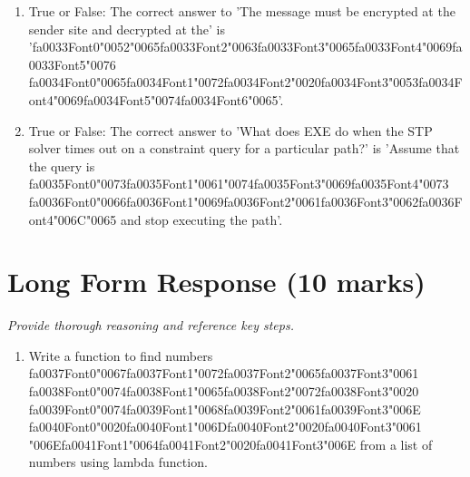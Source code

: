 \documentclass[12pt]{article}
\begin{document}
\begin{enumerate}[label=\arabic*.]
\item True or False: The correct answer to 'The message must be encrypted at the sender site and decrypted at the' is '{\csname fa0033Font0\endcsname\char"0052}{\char"0065}{\csname fa0033Font2\endcsname\char"0063}{\csname fa0033Font3\endcsname\char"0065}{\csname fa0033Font4\endcsname\char"0069}{\csname fa0033Font5\endcsname\char"0076} {\csname fa0034Font0\endcsname\char"0065}{\csname fa0034Font1\endcsname\char"0072}{\csname fa0034Font2\endcsname\char"0020}{\csname fa0034Font3\endcsname\char"0053}{\csname fa0034Font4\endcsname\char"0069}{\csname fa0034Font5\endcsname\char"0074}{\csname fa0034Font6\endcsname\char"0065}'.
\item True or False: The correct answer to 'What does EXE do when the STP solver times out on a constraint query for a particular path?' is 'Assume that the query is {\csname fa0035Font0\endcsname\char"0073}{\csname fa0035Font1\endcsname\char"0061}{\char"0074}{\csname fa0035Font3\endcsname\char"0069}{\csname fa0035Font4\endcsname\char"0073} {\csname fa0036Font0\endcsname\char"0066}{\csname fa0036Font1\endcsname\char"0069}{\csname fa0036Font2\endcsname\char"0061}{\csname fa0036Font3\endcsname\char"0062}{\csname fa0036Font4\endcsname\char"006C}{\char"0065} and stop executing the path'.
\end{enumerate}

\section*{Long Form Response (10 marks)}
\textit{Provide thorough reasoning and reference key steps.}
\begin{enumerate}[label=\arabic*.]
\item Write a function to find numbers {\csname fa0037Font0\endcsname\char"0067}{\csname fa0037Font1\endcsname\char"0072}{\csname fa0037Font2\endcsname\char"0065}{\csname fa0037Font3\endcsname\char"0061} {\csname fa0038Font0\endcsname\char"0074}{\csname fa0038Font1\endcsname\char"0065}{\csname fa0038Font2\endcsname\char"0072}{\csname fa0038Font3\endcsname\char"0020} {\csname fa0039Font0\endcsname\char"0074}{\csname fa0039Font1\endcsname\char"0068}{\csname fa0039Font2\endcsname\char"0061}{\csname fa0039Font3\endcsname\char"006E} {\csname fa0040Font0\endcsname\char"0020}{\csname fa0040Font1\endcsname\char"006D}{\csname fa0040Font2\endcsname\char"0020}{\csname fa0040Font3\endcsname\char"0061} {\char"006E}{\csname fa0041Font1\endcsname\char"0064}{\csname fa0041Font2\endcsname\char"0020}{\csname fa0041Font3\endcsname\char"006E} from a list of numbers using lambda
function.
\end{enumerate}
\end{document}
